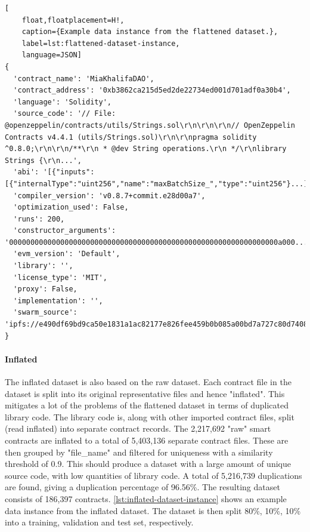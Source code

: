 %
%


\begin{lstlisting}[
    float,floatplacement=H!,
    caption={Example data instance from the flattened dataset.},
    label=lst:flattened-dataset-instance,
    language=JSON]
{
  'contract_name': 'MiaKhalifaDAO',
  'contract_address': '0xb3862ca215d5ed2de22734ed001d701adf0a30b4',
  'language': 'Solidity',
  'source_code': '// File: @openzeppelin/contracts/utils/Strings.sol\r\n\r\n\r\n// OpenZeppelin Contracts v4.4.1 (utils/Strings.sol)\r\n\r\npragma solidity ^0.8.0;\r\n\r\n/**\r\n * @dev String operations.\r\n */\r\nlibrary Strings {\r\n...',
  'abi': '[{"inputs":[{"internalType":"uint256","name":"maxBatchSize_","type":"uint256"}...]',
  'compiler_version': 'v0.8.7+commit.e28d00a7',
  'optimization_used': False,
  'runs': 200,
  'constructor_arguments': '000000000000000000000000000000000000000000000000000000000000000a000...',
  'evm_version': 'Default',
  'library': '',
  'license_type': 'MIT',
  'proxy': False,
  'implementation': '',
  'swarm_source': 'ipfs://e490df69bd9ca50e1831a1ac82177e826fee459b0b085a00bd7a727c80d74089'
}
\end{lstlisting}

\paragraph{Inflated}
\label{sec:verified-smart-contracts-inflated}
The inflated dataset is also based on the raw dataset. Each contract file in the dataset is split into its original representative files and hence  "inflated". This mitigates a lot of the problems of the flattened dataset in terms of duplicated library code. The library code is, along with other imported contract files, split (read inflated) into separate contract records. The 2,217,692 "raw" smart contracts are inflated to a total of 5,403,136 separate contract files. These are then grouped by "file\_name" and filtered for uniqueness with a similarity threshold of 0.9. This should produce a dataset with a large amount of unique source code, with low quantities of library code. A total of 5,216,739 duplications are found, giving a duplication percentage of 96.56\%. The resulting dataset consists of 186,397 contracts. \cref{lst:inflated-dataset-instance} shows an example data instance from the inflated dataset. The dataset is then split 80\%, 10\%, 10\% into a training, validation and test set, respectively.

